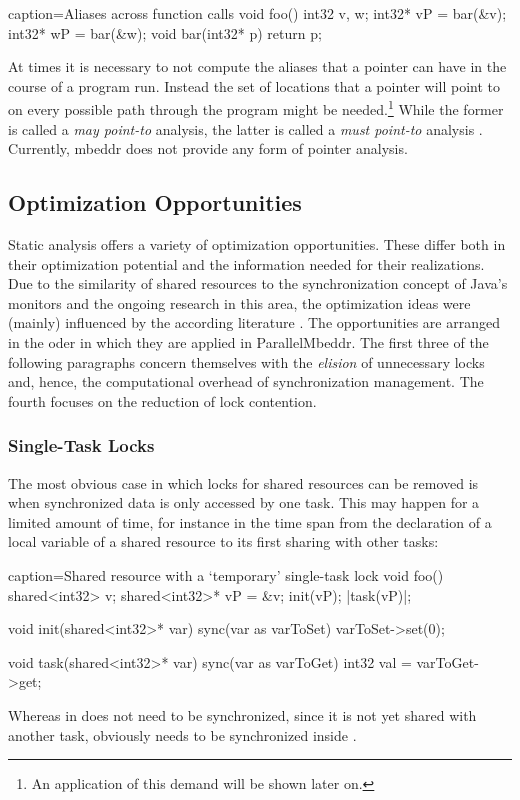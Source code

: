 \begin{ccode}{caption=Aliases across function calls}
void foo() {
  int32 v, w;
  int32* vP = bar(&v);
  int32* wP = bar(&w);
}
void bar(int32* p) {
  return p;
}
\end{ccode}
At times it is necessary to not compute the aliases that a pointer can have in the course of a program run. Instead the set of locations that a pointer will point to on every possible path through the program might be needed.\footnote{An application of this demand will be shown later on.} While the former is called a \textit{may point-to} analysis, the latter is called a \textit{must point-to} analysis \cite{ProgramAnalysisAndSpecialization}.
Currently, mbeddr does not provide any form of pointer analysis.

\subsection{Optimization Opportunities}
Static analysis offers a variety of optimization opportunities. These differ both in their optimization potential and the information needed for their realizations. Due to the similarity of shared resources to the synchronization concept of Java's monitors and the ongoing research in this area, the optimization ideas were (mainly) influenced by the according literature \cite{StaticAnalysesForJava}\cite{JavaTheoryAndPractice}\cite{DoJava6Threading}. The opportunities are arranged in the oder in which they are applied in ParallelMbeddr. The first three of the following paragraphs concern themselves with the \textit{elision} of unnecessary locks and, hence, the computational overhead of synchronization management. The fourth focuses on the reduction of lock contention.

\subsubsection{Single-Task Locks}
The most obvious case in which locks for shared resources can be removed is when synchronized data is only accessed by one task. This may happen for a limited amount of time, for instance in the time span from the declaration of a local variable of a shared resource to its first sharing with other tasks:
\begin{ccode}{caption=Shared resource with a `temporary' single-task lock}
void foo() {
  shared<int32> v;
  shared<int32>* vP = &v;
  init(vP);
  |task(vP)|;
}

void init(shared<int32>* var) {
  sync(var as varToSet) {
    varToSet->set(0);
  }
}

void task(shared<int32>* var) {
  sync(var as varToGet) {
    int32 val = varToGet->get;
  }
}
\end{ccode}
Whereas  in  does not need to be synchronized, since it is not yet shared with another task,  obviously needs to be synchronized inside .

